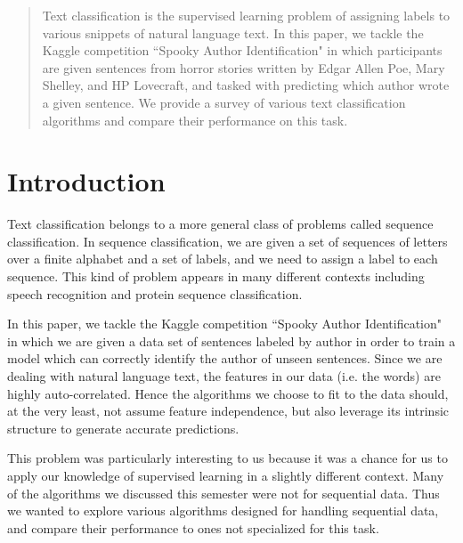 \documentclass{article}
\begin{document}
\begin{abstract}
Text classification is the supervised learning problem of assigning labels to various snippets
of natural language text. In this paper, we tackle the Kaggle competition
``Spooky Author Identification" in which participants are given sentences from
horror stories written by Edgar Allen Poe, Mary Shelley, and HP Lovecraft, and
tasked with predicting which author wrote a given sentence. We provide a survey
of various text classification algorithms and compare their performance on this
task.
\end{abstract}

\section{Introduction}
\label{introduction}
Text classification belongs to a more general class of problems called sequence
classification. In sequence classification, we are given a set of sequences of letters
over a finite alphabet and a set of labels, and we need to assign a label to each
sequence. This kind of problem appears in many different contexts including
speech recognition and protein sequence classification.

In this paper, we tackle the Kaggle competition ``Spooky Author Identification" in
which we are given a data set of sentences labeled by author in order to train a
model which can correctly identify the author of unseen sentences. Since we are
dealing with natural language text, the features in our data (i.e. the words) are
highly auto-correlated. Hence the algorithms we choose to fit to the data should,
at the very least, not assume feature independence, but also leverage its intrinsic
structure to generate accurate predictions.

This problem was particularly interesting to us because it was a chance for us to
apply our knowledge of supervised learning in a slightly different context.
Many of the algorithms we discussed this semester were not for sequential
data. Thus we wanted to explore various algorithms designed for handling
sequential data, and compare their performance to ones not specialized for this
task.
\end{document}
